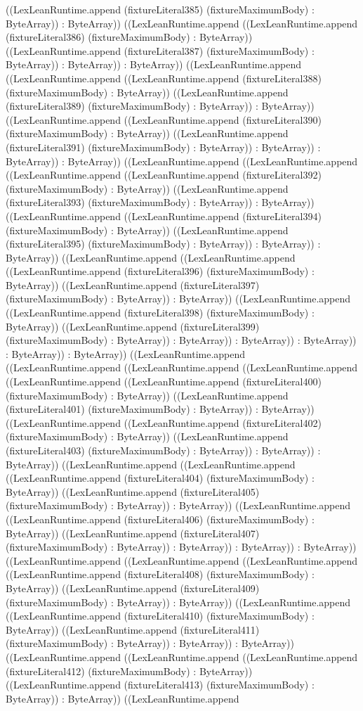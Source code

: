 \documentclass[11pt]{article}
\begin{document}
((LexLeanRuntime.append (fixtureLiteral385) (fixtureMaximumBody) : ByteArray)) : ByteArray)) ((LexLeanRuntime.append ((LexLeanRuntime.append (fixtureLiteral386) (fixtureMaximumBody) : ByteArray)) ((LexLeanRuntime.append (fixtureLiteral387) (fixtureMaximumBody) : ByteArray)) : ByteArray)) : ByteArray)) ((LexLeanRuntime.append ((LexLeanRuntime.append ((LexLeanRuntime.append (fixtureLiteral388) (fixtureMaximumBody) : ByteArray)) ((LexLeanRuntime.append (fixtureLiteral389) (fixtureMaximumBody) : ByteArray)) : ByteArray)) ((LexLeanRuntime.append ((LexLeanRuntime.append (fixtureLiteral390) (fixtureMaximumBody) : ByteArray)) ((LexLeanRuntime.append (fixtureLiteral391) (fixtureMaximumBody) : ByteArray)) : ByteArray)) : ByteArray)) : ByteArray)) ((LexLeanRuntime.append ((LexLeanRuntime.append ((LexLeanRuntime.append ((LexLeanRuntime.append (fixtureLiteral392) (fixtureMaximumBody) : ByteArray)) ((LexLeanRuntime.append (fixtureLiteral393) (fixtureMaximumBody) : ByteArray)) : ByteArray)) ((LexLeanRuntime.append ((LexLeanRuntime.append (fixtureLiteral394) (fixtureMaximumBody) : ByteArray)) ((LexLeanRuntime.append (fixtureLiteral395) (fixtureMaximumBody) : ByteArray)) : ByteArray)) : ByteArray)) ((LexLeanRuntime.append ((LexLeanRuntime.append ((LexLeanRuntime.append (fixtureLiteral396) (fixtureMaximumBody) : ByteArray)) ((LexLeanRuntime.append (fixtureLiteral397) (fixtureMaximumBody) : ByteArray)) : ByteArray)) ((LexLeanRuntime.append ((LexLeanRuntime.append (fixtureLiteral398) (fixtureMaximumBody) : ByteArray)) ((LexLeanRuntime.append (fixtureLiteral399) (fixtureMaximumBody) : ByteArray)) : ByteArray)) : ByteArray)) : ByteArray)) : ByteArray)) : ByteArray)) ((LexLeanRuntime.append ((LexLeanRuntime.append ((LexLeanRuntime.append ((LexLeanRuntime.append ((LexLeanRuntime.append ((LexLeanRuntime.append (fixtureLiteral400) (fixtureMaximumBody) : ByteArray)) ((LexLeanRuntime.append (fixtureLiteral401) (fixtureMaximumBody) : ByteArray)) : ByteArray)) ((LexLeanRuntime.append ((LexLeanRuntime.append (fixtureLiteral402) (fixtureMaximumBody) : ByteArray)) ((LexLeanRuntime.append (fixtureLiteral403) (fixtureMaximumBody) : ByteArray)) : ByteArray)) : ByteArray)) ((LexLeanRuntime.append ((LexLeanRuntime.append ((LexLeanRuntime.append (fixtureLiteral404) (fixtureMaximumBody) : ByteArray)) ((LexLeanRuntime.append (fixtureLiteral405) (fixtureMaximumBody) : ByteArray)) : ByteArray)) ((LexLeanRuntime.append ((LexLeanRuntime.append (fixtureLiteral406) (fixtureMaximumBody) : ByteArray)) ((LexLeanRuntime.append (fixtureLiteral407) (fixtureMaximumBody) : ByteArray)) : ByteArray)) : ByteArray)) : ByteArray)) ((LexLeanRuntime.append ((LexLeanRuntime.append ((LexLeanRuntime.append ((LexLeanRuntime.append (fixtureLiteral408) (fixtureMaximumBody) : ByteArray)) ((LexLeanRuntime.append (fixtureLiteral409) (fixtureMaximumBody) : ByteArray)) : ByteArray)) ((LexLeanRuntime.append ((LexLeanRuntime.append (fixtureLiteral410) (fixtureMaximumBody) : ByteArray)) ((LexLeanRuntime.append (fixtureLiteral411) (fixtureMaximumBody) : ByteArray)) : ByteArray)) : ByteArray)) ((LexLeanRuntime.append ((LexLeanRuntime.append ((LexLeanRuntime.append (fixtureLiteral412) (fixtureMaximumBody) : ByteArray)) ((LexLeanRuntime.append (fixtureLiteral413) (fixtureMaximumBody) : ByteArray)) : ByteArray)) ((LexLeanRuntime.append 
\end{document}
